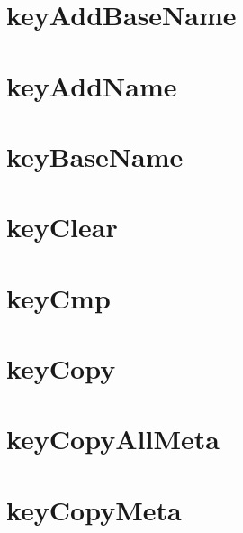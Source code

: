 \let\mypdfximage\pdfximage\def\pdfximage{\immediate\mypdfximage}\documentclass[twoside]{book}
\newcommand{\+}{\discretionary{\mbox{\scriptsize$\hookleftarrow$}}{}{}}
\begin{document}
\chapter{key\+Add\+Base\+Name}
\label{doc_contrib_api_reviews_core_keyAddBaseName_md}

\chapter{key\+Add\+Name}
\label{doc_contrib_api_reviews_core_keyAddName_md}

\chapter{key\+Base\+Name}
\label{doc_contrib_api_reviews_core_keyBaseName_md}

\chapter{key\+Clear}
\label{doc_contrib_api_reviews_core_keyClear_md}

\chapter{key\+Cmp}
\label{doc_contrib_api_reviews_core_keyCmp_md}

\chapter{key\+Copy}
\label{doc_contrib_api_reviews_core_keyCopy_md}

\chapter{key\+Copy\+All\+Meta}
\label{doc_contrib_api_reviews_core_keyCopyAllMeta_md}

\chapter{key\+Copy\+Meta}
\label{doc_contrib_api_reviews_core_keyCopyMeta_md}

\end{document}
